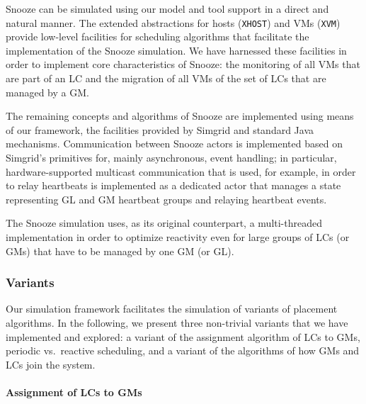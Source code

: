 Snooze can be simulated using our model and tool support in a direct
and natural manner. The extended abstractions  for hosts (\texttt{XHOST}) and VMs
(\texttt{XVM}) provide low-level facilities for scheduling algorithms
that facilitate the implementation of the Snooze simulation. We have
harnessed these facilities in order to implement core characteristics
of Snooze: the monitoring of all VMs that are part of an LC and the
migration of all VMs of the set of LCs that are managed by a GM.

The remaining concepts and algorithms of Snooze are implemented using
means of our framework, the facilities provided by Simgrid and
standard Java mechanisms. Communication between Snooze actors is
implemented based on Simgrid's primitives for, mainly asynchronous,
event handling; in particular, hardware-supported multicast
communication that is used, for example, in order to relay heartbeats
is implemented as a dedicated actor that manages a state representing
GL and GM heartbeat groups and relaying heartbeat events.

The Snooze simulation uses, as its original counterpart, a
multi-threaded implementation in order to optimize reactivity even for
large groups of LCs (or GMs) that have to be managed by one GM (or
GL).

\subsubsection{Variants}
\label{sec:snoozeVariants}

Our simulation framework facilitates the simulation of variants of
placement algorithms. In the following, we present three non-trivial
variants that we have implemented and explored: a variant of the
assignment algorithm of LCs to GMs, periodic vs.\ reactive scheduling,
and a variant of the algorithms of how GMs and LCs join the system.


\paragraph{Assignment of LCs to GMs}

